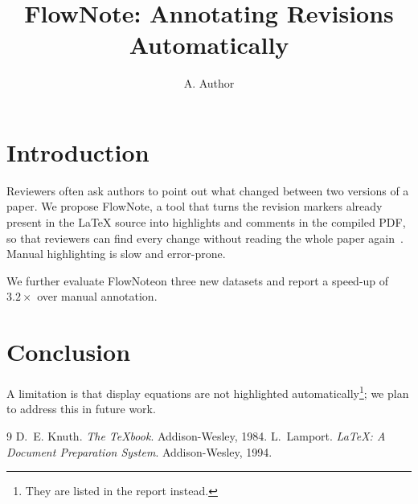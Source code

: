 \documentclass[11pt]{article}
\title{FlowNote: Annotating Revisions Automatically}
\author{A. Author}
\newcommand{\rev}[1]{{\color{revcolor}#1}}   %
\newcommand{\ours}{FlowNote\xspace}
\providecommand{\xspace}{}
\begin{document}
\maketitle

\section{Introduction}
Reviewers often ask authors to point out what changed between two versions of a paper.
{\color{revcolor} %
We propose \ours, a tool that turns the revision markers already present in the \LaTeX{} source
into highlights and comments in the compiled PDF, so that reviewers can find every change
without reading the whole paper again~\cite{knuth,lamport}.}
Manual highlighting is slow and error-prone.

\rev{We further evaluate \ours on three new datasets and report a speed-up of $3.2\times$ over manual annotation.}



\section{Conclusion}
\textcolor{revcolor}{%
A limitation is that display equations are not highlighted automatically\footnote{They are listed in the report instead.}; we plan to address this in future work.}

\begin{thebibliography}{9}
 D.~E. Knuth. \emph{The \TeX book}. Addison-Wesley, 1984.
 L.~Lamport. \emph{\LaTeX: A Document Preparation System}. Addison-Wesley, 1994.
\end{thebibliography}
\end{document}
